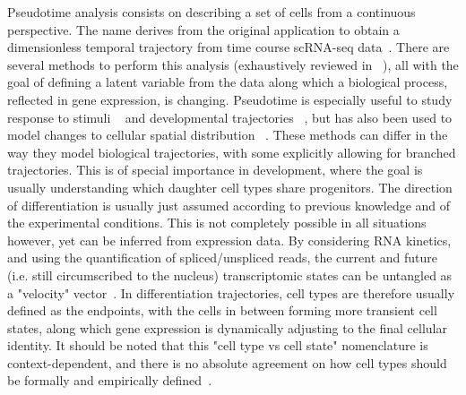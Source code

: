 Pseudotime analysis consists on describing a set of cells from a continuous perspective. The name derives from the original application to obtain a dimensionless temporal trajectory from time course scRNA-seq data~\citep{trapnell_dynamics_2014}. There are several methods to perform this analysis (exhaustively reviewed in ~\citep{saelens_comparison_2019}), all with the goal of defining a latent variable from the data along which a biological process, reflected in gene expression, is changing. Pseudotime is especially useful to study response to stimuli ~\citep{trapnell_dynamics_2014,lonnberg_single-cell_2017} and developmental trajectories ~\citep{cao_single-cell_2019,watcham_new_2019}, but has also been used to model changes to cellular spatial distribution ~\citep{scialdone_resolving_2016}. These methods can differ in the way they model biological trajectories, with some explicitly allowing for branched trajectories. This is of special importance in development, where the goal is usually understanding which daughter cell types share  progenitors. The direction of differentiation is usually just assumed according to previous knowledge and of the experimental conditions. This is not completely possible in all situations however, yet can be inferred from expression data. By considering RNA kinetics, and using the quantification of spliced/unspliced reads, the current and future (i.e. still circumscribed to the nucleus) transcriptomic states can be untangled as a "velocity" vector~\citep{manno_rna_2018}. In differentiation trajectories, cell types are therefore usually defined as the endpoints, with the cells in between forming more transient cell states, along which gene expression is dynamically adjusting to the final cellular identity. It should be noted that this "cell type vs cell state" nomenclature is context-dependent, and there is no absolute agreement on how cell types should be formally and empirically defined~\citep{noauthor_what_2017}. 

